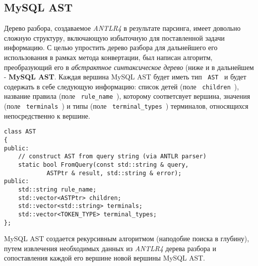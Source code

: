\subsection{MySQL AST}
Дерево разбора, создаваемое \textit{ANTLR4} в результате парсинга, имеет довольно сложную структуру, включающую избыточную для поставленной задачи информацию. С целью упростить дерево разбора для дальнейшего его использования в рамках метода конвертации, был написан алгоритм, преобразующий его в \textit{абстрактное синтаксическое дерево} (ниже и в дальнейшем - \textbf{MySQL AST}. Каждая вершина MySQL AST будет иметь тип \texttt{ AST } и будет содержать в себе следующую информацию: список детей (поле \texttt{ children }), название правила (поле \texttt{ rule_name }), которому соответсвует вершина, значения (поле \texttt{ terminals }) и типы (поле \texttt{  terminal_types }) терминалов, относящихся непосредственно к вершине. 

\begin{code}
    \label{mysql:AST_cpp}
    \begin{verbatim}
class AST
{
public:
    // construct AST from query string (via ANTLR parser)
    static bool FromQuery(const std::string & query,
            ASTPtr & result, std::string & error);
public:
    std::string rule_name;
    std::vector<ASTPtr> children;
    std::vector<std::string> terminals;
    std::vector<TOKEN_TYPE> terminal_types;
};
    \end{verbatim}
\end{code}

MySQL AST создается рекурсивным алгоритмом (наподобие поиска в глубину), путем извлечения необходимых данных из \textit{ANTLR4} дерева разбора и сопоставления каждой его вершине новой вершины MySQL AST.
